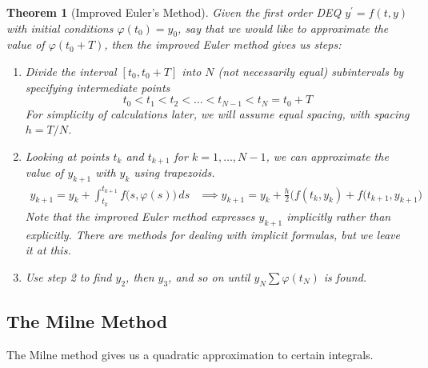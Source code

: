 \documentclass{article}
\newtheorem{theorem}{Theorem}[section]
\theoremstyle{remark}
\theoremstyle{definition}
\begin{document}
    \begin{theorem}[Improved Euler's Method]
    Given the first order DEQ $y^\prime = f(t, y)$ with initial conditions $\varphi(t_0) = y_0$, say that we would like to approximate the value of $\varphi(t_0 + T)$, then the \textit{improved Euler method} gives us steps: 
    \begin{enumerate}
        \item Divide the interval $[t_0, t_0 + T]$ into $N$ (not necessarily equal) subintervals by specifying intermediate points 
        \[t_0 < t_1 < t_2 < \ldots < t_{N-1} < t_N = t_0 + T\]
        For simplicity of calculations later, we will assume equal spacing, with spacing $h = T/N$. 
        \item Looking at points $t_k$ and $t_{k+1}$ for $k = 1, \ldots, N-1$, we can approximate the value of $y_{k+1}$ with $y_k$ using trapezoids.
        \begin{align*}
            y_{k+1} = y_k + \int_{t_k}^{t_{k+1}} f\big( s, \varphi(s)\big)\,ds & \implies y_{k+1} = y_k + \frac{h}{2} \big(f(t_k, y_k) + f(t_{k+1}, y_{k+1}\big) 
        \end{align*}
        Note that the improved Euler method expresses $y_{k+1}$ implicitly rather than explicitly. There are methods for dealing with implicit formulas, but we leave it at this. 
        \item Use step 2 to find $y_2$, then $y_3$, and so on until $y_N \sum \varphi(t_N)$ is found. 
    \end{enumerate}
    \end{theorem}

  \subsection{The Milne Method}

    The Milne method gives us a quadratic approximation to certain integrals. 
\end{document}
